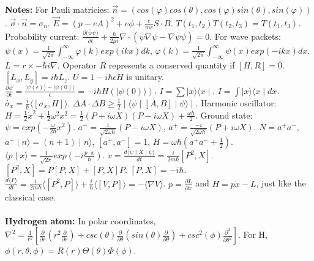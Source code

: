 {\bf Notes:}
For Pauli matricies: ${\vec n} = (cos(\varphi)cos(\theta), cos(\varphi)sin(\theta), sin(\varphi))$.
${\vec \sigma} \cdot {\vec n} = \sigma_n$. ${\vec E} = (p-eA)^2 +e \phi + {\frac {e} {mc}}S \cdot B$.
$T(t_1 , t_2 ) T( t_2 , t_3 ) = T(t_1 , t_3)$. Probability current:
${\frac {\partial {({\overline \psi}\psi})} {\partial t}} + {\frac {\hbar} {2 \mu i}} \nabla \cdot
({\overline \psi} {\nabla \psi} - {\nabla {\overline \psi}} \psi) = 0$.
For wave packets:
$\psi(x) = {\frac 1 {\sqrt {2 \pi}}} \int_{-\infty}^{\infty} \varphi(k) exp(ikx) dk$,
$\varphi(k) = {\frac 1 {\sqrt {2 \pi}}} \int_{-\infty}^{\infty} \psi(x) exp(-ikx) dx$.
$L = r \times - \hbar i \nabla$. Operator $R$ represents a conserved quantity if $[H,R]=0$. 
$[L_x, L_y] = i \hbar L_z$.  $U = 1 -i  \hbar \epsilon H$ is unitary.
${\frac {\partial \psi} {\partial t}}=
{\frac {\mid \psi(\epsilon)\rangle - \mid \psi(0)\rangle} {\epsilon}}= -i \hbar H(\mid \psi(0) \rangle)$.
$I= \sum \mid x \rangle \langle x \mid$, $I= \int  \mid x \rangle \langle x \mid dx$.
${\dot {\sigma_x}}= {\frac {i} {\hbar}} \langle [\sigma_x, H]\rangle$.
$\Delta A \cdot \Delta B \geq {\frac 1 2} \mid \langle \psi \mid [A, B] \mid \psi \rangle \mid$.
Harmonic oscillator: $H = {\frac 1 2} {\dot x}^2 + {\frac 1 2} \omega^2 x^2=
{\frac 1 2} (P+i \omega X)(P - i \omega X) + {\frac {\omega \hbar} 2}$.
Ground state: $\psi= exp(-{\frac {\omega} {2 \hbar}} x^2)$.
$a^- = {\frac {i} {{\sqrt {2 \omega \hbar}}}} (P-i \omega X) $,
$a^+ = {\frac {-i} {{\sqrt {2 \omega \hbar}}}} (P+i \omega X) $.  $N= a^+ a^-$,
$a^+ \mid n\rangle = (n+1) \mid n \rangle$, $[a^+, a^-]=1$, $H = \omega \hbar (a^+ a^- + {\frac 1 2})$.
$\langle p \mid x \rangle = {\frac 1 {\sqrt {2 \pi}}} exp(-i{\frac {p \cdot x} {\hbar}})$.
$v = {\frac { d \langle \psi \mid X \mid \psi \rangle} {dt}} = {\frac i {2m \hbar}} [P^2, X]$.
$[P^2, X] = P[P,X] + [P, X]P$.
$[P, X] = -i \hbar$. ${\frac {d \langle P \rangle}  {dt}}= {\frac i {2m \hbar}} \langle [P^2, P] \rangle
+ {\frac i {\hbar}}\langle [V, P] \rangle= - \langle  \nabla V \rangle$. $p = {\frac {\partial L}
{\partial {\dot x}}}$ and $H= p {\dot x} - L$, just like the classical case.
\\
\\
{\bf Hydrogen atom:}  In polar coordinates,
$\nabla^2 = {\frac 1 {r^2}} [
{\frac {\partial} {\partial r}} (r^2 {\frac {\partial} {\partial r}}) +
csc(\theta) {\frac {\partial} {\partial \theta}} (sin(\theta) {\frac {\partial} {\partial \theta}})+
csc^2(\phi) {\frac {\partial^2} {\partial \theta^2}}]$.   For H,
$\phi(r, \theta, \phi)= R(r) \Theta(\theta) \Phi(\phi)$.
